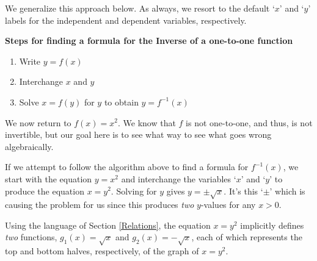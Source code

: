 \documentclass{ximera}
\begin{document}
  We generalize this approach below.  As always, we resort to the default `$x$' and `$y$'  labels for the independent and dependent variables, respectively. 
  
\smallskip
 

 \label{inverseprocedure}

\centerline{\textbf{Steps for finding a formula for the Inverse of a one-to-one function}}  

\begin{enumerate}

\item  Write $y=f(x)$

\item Interchange $x$ and $y$

\item  Solve $x = f(y)$ for $y$ to obtain $y=f^{-1}(x)$

\end{enumerate}


\smallskip 

We now return to $f(x) = x^2$.  We know that $f$ is not one-to-one, and thus, is not invertible, but our goal here is to see what  way to see what goes wrong algebraically.


\smallskip

If we attempt to follow the algorithm above to find a formula for $f^{-1}(x)$, we start with the equation $y=x^2$ and interchange the  variables `$x$' and `$y$' to produce the equation $x = y^2$.  Solving for $y$ gives $y = \pm \sqrt{x}$.  It's this `$\pm$' which is causing the problem for us since this produces \textit{two} $y$-values for any $x>0$. 

\smallskip


Using the language of Section \ref{Relations},  the equation $x = y^2$ implicitly defines \textit{two} functions, $g_{1}(x) = \sqrt{x}$ and $g_{2}(x) = -\sqrt{x}$, each of which represents the top and bottom halves, respectively, of the graph of $x = y^2$.
\end{document}
